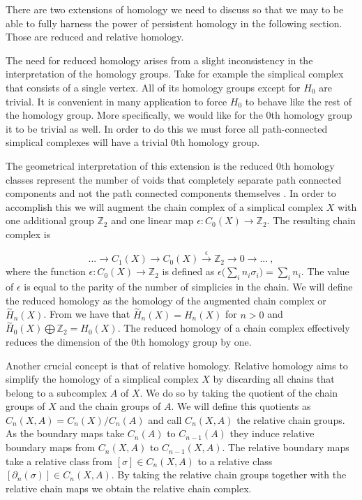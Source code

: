 There are two extensions of homology we need to discuss so that we may to be able to fully harness the power of persistent homology in the following section. Those are reduced and relative homology.

The need for reduced homology arises from a slight inconsistency in the interpretation of the homology groups. Take for example the simplical complex that consists of a single vertex. All of its homology groups except for $H_0$ are trivial. It is convenient in many application to force $H_0$ to behave like the rest of the homology group. More specifically, we would like for the 0th homology group it to be trivial as well. In order to do this we must force all path-connected simplical complexes will have a trivial 0th homology group.

The geometrical interpretation of this extension is the reduced 0th homology classes represent the number of voids that completely separate path connected components and not the path connected components themselves \cite[p. 83]{comp-topo}. In order to accomplish this we will augment the chain complex of a simplical complex $X$ with one additional group $\mathbb{Z}_2$ and one linear map $\epsilon : C_0(X) \to \mathbb{Z}_2$. The resulting chain complex is

$$ ... \longrightarrow C_1(X) \longrightarrow C_0(X) \overset{\epsilon}{\longrightarrow} \mathbb{Z}_2 \longrightarrow 0 \longrightarrow ...~, $$
where the function $\epsilon: C_0(X) \to \mathbb{Z}_2$ is defined as $\epsilon\big(\sum_{i}n_i\sigma_i\big) = \sum_{i}n_i$. The value of $\epsilon$ is equal to the parity of the number of simplicies in the chain. We will define the reduced homology as the homology of the augmented chain complex or $\overset{\sim}{H}_n(X)$. From \cite[p. 110]{algebraic-topology} we have that $\overset{\sim}{H}_n(X) = H_n(X)$ for $n > 0$ and $\overset{\sim}{H}_0(X) \bigoplus \mathbb{Z}_2 = H_0(X)$. The reduced homology of a chain complex effectively reduces the dimension of the 0th homology group by one.

Another crucial concept is that of relative homology. Relative homology aims to simplify the homology of a simplical complex $X$ by discarding all chains that belong to a subcomplex $A$ of $X$. We do so by taking the quotient of the chain groups of $X$ and the chain groups of $A$. We will define this quotients as $C_n(X, A) = C_n(X) / C_n(A)$ and call $C_n(X, A)$ the relative chain groups. As the boundary maps take $C_n(A)$ to $C_{n-1}(A)$ they induce relative boundary maps from $C_n(X, A)$ to $C_{n-1}(X, A)$. The relative boundary maps take a relative class from $[\sigma] \in C_n(X, A)$ to a relative class $[\partial_n(\sigma)] \in C_n(X, A)$. By taking the relative chain groups together with the relative chain maps we obtain the relative chain complex.


